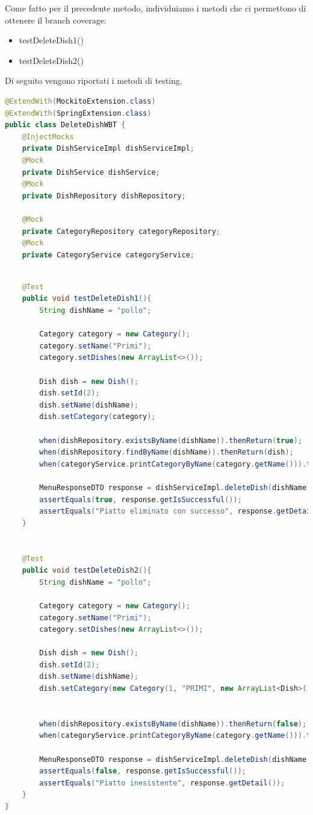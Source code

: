 Come fatto per il precedente metodo, individuiamo i metodi che ci permettono di ottenere il branch coverage:
\begin{itemize}
    \item testDeleteDish1()
    \item testDeleteDish2()
\end{itemize}
Di seguito vengono riportati i metodi di testing.
\begin{lstlisting}[language=java]
@ExtendWith(MockitoExtension.class)
@ExtendWith(SpringExtension.class)
public class DeleteDishWBT {
    @InjectMocks
    private DishServiceImpl dishServiceImpl;
    @Mock
    private DishService dishService;
    @Mock
    private DishRepository dishRepository;

    @Mock
    private CategoryRepository categoryRepository;
    @Mock
    private CategoryService categoryService;
\end{lstlisting}
\newpage
\begin{lstlisting}[language=java]

    @Test
    public void testDeleteDish1(){
        String dishName = "pollo";

        Category category = new Category();
        category.setName("Primi");
        category.setDishes(new ArrayList<>());

        Dish dish = new Dish();
        dish.setId(2);
        dish.setName(dishName);
        dish.setCategory(category);

        when(dishRepository.existsByName(dishName)).thenReturn(true);
        when(dishRepository.findByName(dishName)).thenReturn(dish);
        when(categoryService.printCategoryByName(category.getName())).thenReturn(new MenuResponseDTO(new CategoryDishDTO(category.getDishes(), category), "Piatto eliminato con successo", true));

        MenuResponseDTO response = dishServiceImpl.deleteDish(dishName, category);
        assertEquals(true, response.getIsSuccessful());
        assertEquals("Piatto eliminato con successo", response.getDetail());
    }


    @Test
    public void testDeleteDish2(){
        String dishName = "pollo";

        Category category = new Category();
        category.setName("Primi");
        category.setDishes(new ArrayList<>());

        Dish dish = new Dish();
        dish.setId(2);
        dish.setName(dishName);
        dish.setCategory(new Category(1, "PRIMI", new ArrayList<Dish>()));


        when(dishRepository.existsByName(dishName)).thenReturn(false);
        when(categoryService.printCategoryByName(category.getName())).thenReturn(new MenuResponseDTO(new CategoryDishDTO(category.getDishes(), category), "Piatto inesistente", false));

        MenuResponseDTO response = dishServiceImpl.deleteDish(dishName, category);
        assertEquals(false, response.getIsSuccessful());
        assertEquals("Piatto inesistente", response.getDetail());
    }
}

\end{lstlisting}
